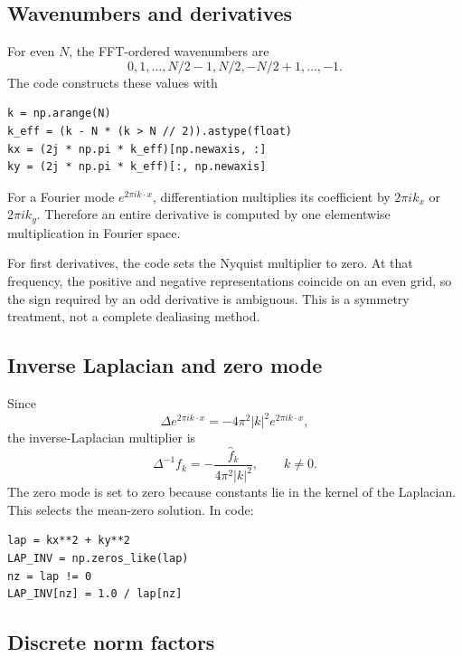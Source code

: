 \documentclass[12pt,a4paper]{article}
\newcommand{\Lap}{\Delta}
\newcommand{\lapinv}{\Delta^{-1}}
\theoremstyle{definition}
\begin{document}
\subsection{Wavenumbers and derivatives}

For even $N$, the FFT-ordered wavenumbers are
\begin{equation}
  0,1,\ldots,N/2-1,N/2,-N/2+1,\ldots,-1.
\end{equation}
The code constructs these values with
\begin{lstlisting}[style=python]
k = np.arange(N)
k_eff = (k - N * (k > N // 2)).astype(float)
kx = (2j * np.pi * k_eff)[np.newaxis, :]
ky = (2j * np.pi * k_eff)[:, np.newaxis]
\end{lstlisting}
For a Fourier mode $e^{2\pi i k\cdot x}$, differentiation multiplies its
coefficient by $2\pi i k_x$ or $2\pi i k_y$. Therefore an entire derivative
is computed by one elementwise multiplication in Fourier space.

For first derivatives, the code sets the Nyquist multiplier to zero. At
that frequency, the positive and negative representations coincide on an
even grid, so the sign required by an odd derivative is ambiguous. This is
a symmetry treatment, not a complete dealiasing method.

\subsection{Inverse Laplacian and zero mode}

Since
\begin{equation}
  \Lap e^{2\pi i k\cdot x}=-4\pi^2|k|^2e^{2\pi i k\cdot x},
\end{equation}
the inverse-Laplacian multiplier is
\begin{equation}
  \widehat{\lapinv f}_k=
  -\frac{\widehat f_k}{4\pi^2|k|^2},\qquad k\ne0.
\end{equation}
The zero mode is set to zero because constants lie in the kernel of the
Laplacian. This selects the mean-zero solution. In code:
\begin{lstlisting}[style=python]
lap = kx**2 + ky**2
LAP_INV = np.zeros_like(lap)
nz = lap != 0
LAP_INV[nz] = 1.0 / lap[nz]
\end{lstlisting}

\subsection{Discrete norm factors}
\end{document}
